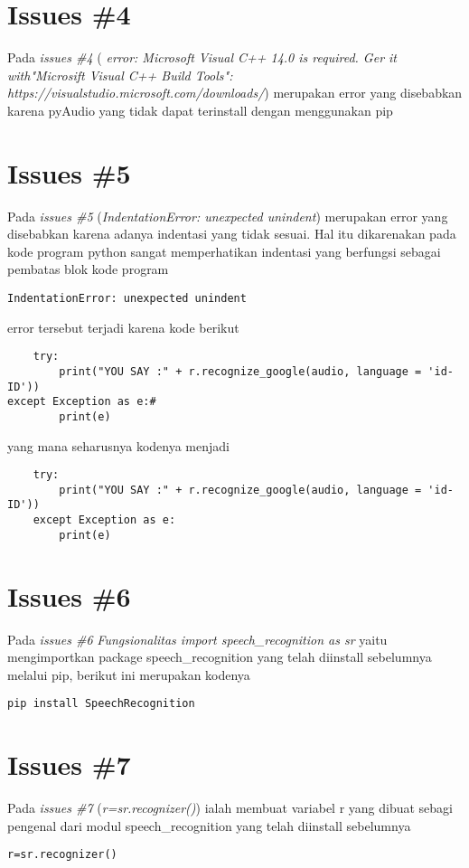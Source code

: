 \section{Issues \#4}
Pada \textit{issues \#4} (\textit{
error: Microsoft Visual C++ 14.0 is required. Ger it with"Microsift Visual C++ Build Tools": https://visualstudio.microsoft.com/downloads/}) merupakan error yang disebabkan karena pyAudio yang tidak dapat terinstall dengan menggunakan pip

\section{Issues \#5}
Pada \textit{issues \#5} (\textit{IndentationError: unexpected unindent}) merupakan error yang disebabkan karena adanya indentasi yang tidak sesuai. Hal itu dikarenakan pada kode program python sangat memperhatikan indentasi yang berfungsi sebagai pembatas blok kode program
\begin{verbatim}
IndentationError: unexpected unindent
\end{verbatim}
error tersebut terjadi karena kode berikut
\begin{verbatim}
    try:
        print("YOU SAY :" + r.recognize_google(audio, language = 'id-ID'))
except Exception as e:#
        print(e)
\end{verbatim} yang mana seharusnya kodenya menjadi
\begin{verbatim}
    try:
        print("YOU SAY :" + r.recognize_google(audio, language = 'id-ID'))
    except Exception as e:
        print(e)
\end{verbatim}

\section{Issues \#6}
Pada \textit{issues \#6} \textit{Fungsionalitas import speech\_recognition as sr}
yaitu mengimportkan package speech\_recognition yang telah diinstall sebelumnya melalui pip, berikut ini merupakan kodenya
\begin{verbatim}
pip install SpeechRecognition
\end{verbatim}
\section{Issues \#7}
Pada \textit{issues \#7} (\textit{r=sr.recognizer()}) ialah membuat variabel r yang dibuat sebagi pengenal dari modul speech\_recognition yang telah diinstall sebelumnya
\begin{verbatim}
r=sr.recognizer()
\end{verbatim}
